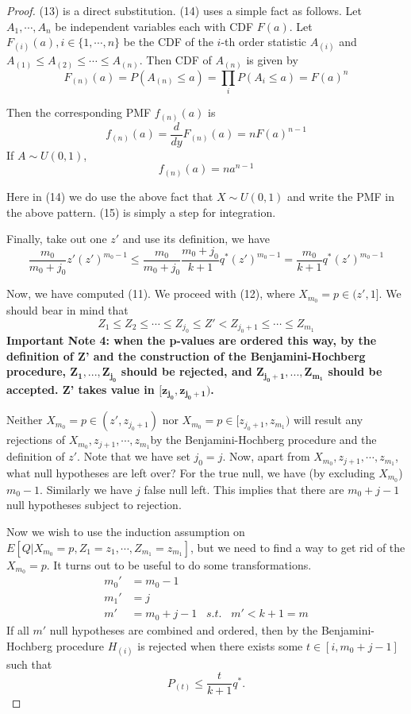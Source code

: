 \documentclass[12pt]{article}
\theoremstyle{plain}
\theoremstyle{definition}
\theoremstyle{remark}
\begin{document}
\begin{proof}
(13) is a direct substitution. (14) uses a simple fact as follows. Let $A_1,\cdots,A_n$ be independent variables each with CDF $F(a)$. Let $F_{(i)}(a),i \in \{1,\cdots,n\}$ be the CDF of the $i$-th order statistic $A_{(i)}$ and $A_{(1)}\leq A_{(2)}\leq \cdots \leq A_{(n)}$. Then CDF of $A_{(n)}$ is given by \[
F_{(n)}(a)=P(A_{(n)}\leq a)=\prod_iP(A_i\leq a)=F(a)^n
\]

Then the corresponding PMF $f_{(n)}(a)$ is \[
f_{(n)}(a)=\frac{d}{dy}F_{(n)}(a)=nF(a)^{n-1}
\]
If $A\sim U(0,1)$,
\[ f_{(n)}(a)=na^{n-1}\]

Here in (14) we do use the above fact that $X\sim U(0,1)$ and write the PMF in the above pattern. (15) is simply a step for integration.

Finally, take out one $z'$ and use its definition, we have
\begin{equation}
 \frac{m_0}{m_0+j_0}z'(z')^{m_0-1}
\leq \frac{m_0}{m_0+j_0}\frac{m_0+j_0}{k+1}q^*(z')^{m_0-1}=\frac{m_0}{k+1}q^*(z')^{m_0-1}   
\end{equation}

Now, we have computed (11). We proceed with (12), where $X_{m_0}=p\in(z',1]$. We should bear in mind that \[
Z_1\leq Z_2 \leq \cdots \leq Z_{j_0} \leq Z' < Z_{j_0+1} \leq \cdots \leq Z_{m_1}
\]
\textbf{Important Note 4: when the p-values are ordered this way, by the definition of Z' and the construction of the Benjamini-Hochberg procedure, $\mathbf{Z_1,...,Z_{j_0}}$ should be rejected, and $\mathbf{Z_{j_0+1},...,Z_{m_1}}$ should be accepted. Z' takes value in $\mathbf{[z_{j_0},z_{j_0+1})}$. }

Neither $X_{m_0}=p\in(z',z_{j_0+1})$ nor $X_{m_0}=p\in[z_{j_0+1},z_{m_1})$ will result any rejections of $X_{m_0}, z_{j+1},\cdots,z_{m_1} $by the Benjamini-Hochberg procedure and the definition of $z'$. Note that we have set $j_0=j$. Now, apart from $X_{m_0}, z_{j+1},\cdots,z_{m_1}$, what null hypotheses are left over? For the true null, we have (by excluding $X_{m_0}$) $m_0-1$. Similarly we have $j$ false null left. This implies that there are $m_0+j-1$ null hypotheses subject to rejection.

Now we wish to use the induction assumption on $E[Q|X_{m_0}=p,Z_1=z_1,\cdots,Z_{m_1}=z_{m_1}]$, but we need to find a way to get rid of the $X_{m_0}=p$. It turns out to be useful to do some transformations.
\begin{equation*}
    \begin{split}
    m_0'&=m_0-1\\
    m_1'&=j\\
    m'&=m_0+j-1 \;\;\;s.t.\;\;\; m'<k+1=m
    \end{split}
\end{equation*}
If all $m'$ null hypotheses are combined and ordered, then by the Benjamini-Hochberg procedure \(H_{(i)}\) is rejected when there exists some $t\in [i,m_0+j-1]$ such that  \[
P_{(t)}\leq \frac{t}{k+1}q^*.
\]


\end{proof}
\end{document}
